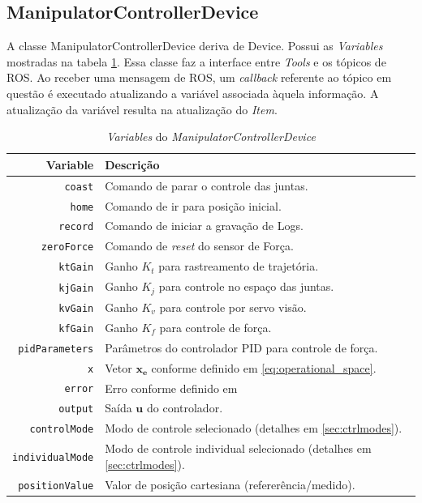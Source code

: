 \subsection{ManipulatorControllerDevice}

A classe ManipulatorControllerDevice deriva de Device. Possui as \textit{Variables} mostradas na tabela \ref{tab:variables}. Essa classe faz a interface entre \textit{Tools} e os tópicos de ROS. Ao receber uma mensagem de ROS, um \textit{callback} referente ao tópico em questão é executado atualizando a variável associada àquela informação. A atualização da variável resulta na atualização do \textit{Item}.


\begin{table}[h!]
\centering
\caption{\textit{Variables} do \textit{ManipulatorControllerDevice}}
\label{tab:variables}
\begin{tabular}{rl} \hline
Variable & Descrição \\ \hline
\verb|coast| & 				Comando de parar o controle das juntas. \\
\verb|home| &  				Comando de ir para posição inicial. \\
\verb|record|& 				Comando de iniciar a gravação de Logs.\\
\verb|zeroForce|& 			Comando de \textit{reset} do sensor de Força.\\
\verb|ktGain|&				Ganho $K_t$ para rastreamento de trajetória. \\
\verb|kjGain|&				Ganho $K_j$ para controle no espaço das juntas.\\
\verb|kvGain|&				Ganho $K_v$ para controle por servo visão.\\
\verb|kfGain|&				Ganho $K_f$ para controle de força.\\
\verb|pidParameters|&		Parâmetros do controlador PID para controle de força.\\
\verb|x|&					Vetor $\bm{x_e}$ conforme definido em \ref{eq:operational_space}.\\				
\verb|error|&				Erro conforme definido em \\
\verb|output|&				Saída $\bm{u}$ do controlador.\\
\verb|controlMode|&			Modo de controle selecionado (detalhes em \ref{sec:ctrlmodes}). \\
\verb|individualMode|&		Modo de controle individual selecionado (detalhes em \ref{sec:ctrlmodes}).\\
\verb|positionValue|&		Valor de posição cartesiana (refererência/medido). \\

\end{tabular}
\end{table}

